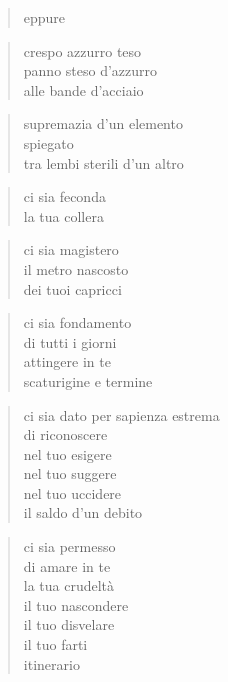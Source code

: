 	\begin{verse}
		eppure
	\end{verse}

\clearpage


\vspace*{2cm}

	\begin{verse}
		crespo azzurro teso\\
		panno steso d’azzurro\\
		alle bande d’acciaio
	\end{verse}

	\begin{verse}
		supremazia d’un elemento\\
		spiegato\\
		tra lembi sterili d’un altro
	\end{verse}

	\begin{verse}
		ci sia feconda\\
		la tua collera
	\end{verse}

	\begin{verse}
		ci sia magistero\\
		il metro nascosto\\
		dei tuoi capricci
	\end{verse}

	\begin{verse}
		ci sia fondamento\\
		di tutti i giorni\\
		attingere in te\\
		scaturigine e termine
	\end{verse}

	\begin{verse}
		ci sia dato
		per sapienza estrema\\
		di riconoscere\\
		nel tuo esigere\\
		nel tuo suggere\\
		nel tuo uccidere\\
		il saldo d’un debito
	\end{verse}

	\begin{verse}
		ci sia permesso\\
		di amare in te\\
		la tua crudeltà\\
		il tuo nascondere\\
		il tuo disvelare\\
		il tuo farti\\
		itinerario
	\end{verse}


